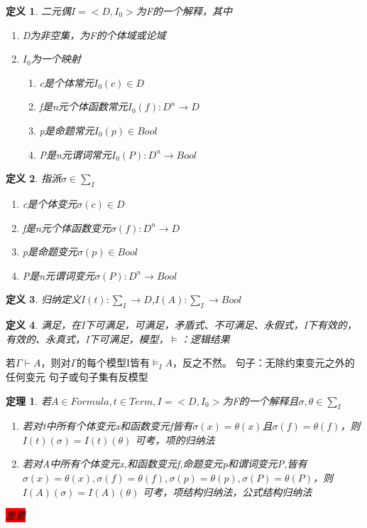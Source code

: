 \documentclass[a4paper]{ctexart}
\newtheorem{thm}{\hspace{2em}定理}[subsection]
\newtheorem{defi}{\hspace{2em}定义}[subsection]
\newcommand{\shade}[1]{\colorbox{shadecolor}{#1}}
\newcommand{\redshade}[1]{\colorbox{red}{#1}}
\begin{document}
\begin{defi}
  二元偶$I=<D,I_0>$为F的一个解释，其中
  \begin{enumerate}[itemindent=2em]
    \item D为非空集，为F的个体域或论域
    \item $I_0$为一个映射
      \begin{enumerate}[itemindent=3em]
        \item c是个体常元$I_0(c)\in D$
        \item f是n元个体函数常元$I_0(f):D^n\rightarrow D$
        \item p是命题常元$I_0(p)\in Bool$
        \item P是n元谓词常元$I_0(P):D^n\rightarrow Bool$
      \end{enumerate}
  \end{enumerate}
\end{defi}

\begin{defi}
  指派$\sigma\in \sum_I$
  \begin{enumerate}[itemindent=2em]
    \item c是个体变元$\sigma(c)\in D$
    \item f是n元个体函数变元$\sigma(f):D^n\rightarrow D$
    \item p是命题变元$\sigma(p)\in Bool$
    \item P是n元谓词变元$\sigma(P):D^n\rightarrow Bool$
  \end{enumerate}
\end{defi}

\begin{defi}
  归纳定义$I(t):\sum_I\rightarrow D$,$I(A):\sum_I\rightarrow Bool$
\end{defi}

\begin{defi}
  满足，在I下可满足，可满足，矛盾式、不可满足、永假式，I下有效的，有效的、永真式，I下可满足，模型，$\models$：逻辑结果
\end{defi}
若$\Gamma\vdash A$，则对$\Gamma$的每个模型I皆有$\models_IA$，反之不然。
句子：无除约束变元之外的任何变元
句子或句子集有反模型
\begin{thm}
  若$A\in Formula,t\in Term,I=<D,I_0>$为F的一个解释且$\sigma,\theta\in\sum_I$
  \begin{enumerate}[itemindent=2em]
    \item 若对t中所有个体变元x和函数变元f皆有$\sigma(x)=\theta(x)$且$\sigma(f)=\theta(f)$，则$I(t)(\sigma)=I(t)(\theta)$ \shade{可考，项的归纳法}
    \item 若对A中所有个体变元x,和函数变元f,命题变元p和谓词变元P,皆有$\sigma(x)=\theta(x),\sigma(f)=\theta(f),\sigma(p)=\theta(p),\sigma(P)=\theta(P)$，则$I(A)(\sigma)=I(A)(\theta)$ \shade{可考，项结构归纳法，公式结构归纳法}
  \end{enumerate} \redshade{重要}
\end{thm}
\end{document}
